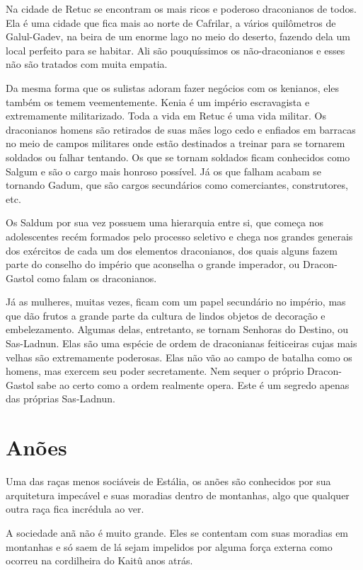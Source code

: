 \documentclass{RPG_Adventure}[2021/10/20]
\begin{document}
Na cidade de Retuc se encontram os mais ricos e poderoso draconianos de todos.
Ela é uma cidade que fica mais ao norte de Cafrilar, a vários quilômetros de
Galul-Gadev, na beira de um enorme lago no meio do deserto, fazendo dela um
local perfeito para se habitar. Ali são pouquíssimos os não-draconianos e esses
não são tratados com muita empatia.

Da mesma forma que os sulistas adoram fazer negócios com os kenianos, eles
também os temem veementemente. Kenia é um império escravagista e extremamente
militarizado. Toda a vida em Retuc é uma vida militar. Os draconianos homens são
retirados de suas mães logo cedo e enfiados em barracas no meio de campos
militares onde estão destinados a treinar para se tornarem soldados ou falhar
tentando. Os que se tornam soldados ficam conhecidos como Salgum e são o cargo
mais honroso possível. Já os que falham acabam se tornando Gadum, que são cargos
secundários como comerciantes, construtores, etc.

Os Saldum por sua vez possuem uma hierarquia entre si, que começa nos
adolescentes recém formados pelo processo seletivo e chega nos grandes generais
dos exércitos de cada um dos elementos draconianos, dos quais alguns fazem parte
do conselho do império que aconselha o grande imperador, ou Dracon-Gastol como
falam os draconianos.

Já as mulheres, muitas vezes, ficam com um papel secundário no império, mas que
dão frutos a grande parte da cultura de lindos objetos de decoração e
embelezamento. Algumas delas, entretanto, se tornam Senhoras do Destino, ou
Sas-Ladnun. Elas são uma espécie de ordem de draconianas feiticeiras cujas mais
velhas são extremamente poderosas. Elas não vão ao campo de batalha como os
homens, mas exercem seu poder secretamente. Nem sequer o próprio Dracon-Gastol
sabe ao certo como a ordem realmente opera. Este é um segredo apenas das
próprias Sas-Ladnun.

\section*{Anões}%

Uma das raças menos sociáveis de Estália, os anões são conhecidos por sua
arquitetura impecável e suas moradias dentro de montanhas, algo que qualquer
outra raça fica incrédula ao ver.

A sociedade anã não é muito grande. Eles se contentam com suas moradias em
montanhas e só saem de lá sejam impelidos por alguma força externa como ocorreu
na cordilheira do Kaitû anos atrás.
\end{document}
